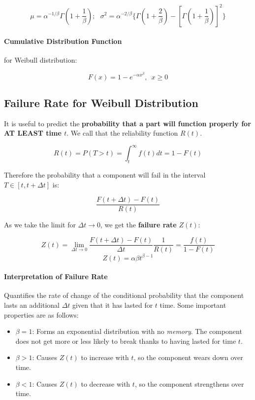\documentclass[a4paper,12pt]{report}
\begin{document}
$$\mu = \alpha^{-1/\beta} \Gamma(1+\frac{1}{\beta});\,\,\,\, \sigma^2 = \alpha^{-2/\beta}\{ \Gamma(1 + \frac{2}{\beta}) - [\Gamma(1 + \frac{1}{\beta})]^2 \}$$

\paragraph{Cumulative Distribution Function } for Weibull distribution:

$$F(x) = 1 - e^{-\alpha x ^\beta}, \,\,\, x \geq 0$$

\subsection{Failure Rate for Weibull Distribution}

It is useful to predict the \textbf{probability that a part will function properly for AT LEAST time $t$}. We call that the reliability function $R(t)$.

$$R(t) = P(T > t) = \int_t^{\infty} f(t) dt = 1 - F(t)$$

Therefore the probability that a component will fail in the interval $T \in [t, t+\Delta t]$ is:

$$\frac{F(t + \Delta t) - F(t)}{R(t)}$$

As we take the limit for $\Delta t \to 0$, we get the \textbf{failure rate} $Z(t)$:

$$Z(t) = \lim_{\Delta t \to 0} \frac{F(t + \Delta t) - F(t)}{\Delta t} \frac{1}{R(t)} = \frac{f(t)}{1 - F(t)}$$
$$Z(t) = \alpha \beta t^{\beta - 1}$$

\paragraph{Interpretation of Failure Rate} 

Quantifies the rate of change of the conditional probability that the component lasts an additional $\Delta t$ given that it has lasted for $t$ time. Some important properties are as follows: 

\begin{itemize}
\item $\beta = 1$: Forms an exponential distribution with no \textit{memory}. The component does not get more or less likely to break thanks to having lasted for time $t$.
\item $\beta > 1$: Causes $Z(t)$ to increase with $t$, so the component wears down over time.
\item $\beta < 1$: Causes $Z(t)$ to decrease with $t$, so the component strengthens over time.
\end{itemize}
\end{document}
